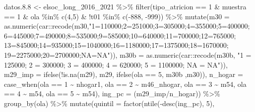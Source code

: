 \documentclass[
  12pt,
]{book}
\newenvironment{Shaded}{\begin{snugshade}}{\end{snugshade}}
\newcommand{\AttributeTok}[1]{\textcolor[rgb]{0.77,0.63,0.00}{#1}}
\newcommand{\DecValTok}[1]{\textcolor[rgb]{0.00,0.00,0.81}{#1}}
\newcommand{\FloatTok}[1]{\textcolor[rgb]{0.00,0.00,0.81}{#1}}
\newcommand{\FunctionTok}[1]{\textcolor[rgb]{0.00,0.00,0.00}{#1}}
\newcommand{\NormalTok}[1]{#1}
\newcommand{\OtherTok}[1]{\textcolor[rgb]{0.56,0.35,0.01}{#1}}
\newcommand{\SpecialCharTok}[1]{\textcolor[rgb]{0.00,0.00,0.00}{#1}}
\newcommand{\StringTok}[1]{\textcolor[rgb]{0.31,0.60,0.02}{#1}}
\begin{document}
\begin{Shaded}
\begin{Highlighting}[]
\NormalTok{datos.}\FloatTok{8.8} \OtherTok{\textless{}{-}}\NormalTok{ elsoc\_long\_2016\_2021 }\SpecialCharTok{\%\textgreater{}\%} 
  \FunctionTok{filter}\NormalTok{(tipo\_atricion }\SpecialCharTok{==} \DecValTok{1} \SpecialCharTok{\&}\NormalTok{ muestra }\SpecialCharTok{==} \DecValTok{1} \SpecialCharTok{\&}\NormalTok{ ola }\SpecialCharTok{\%in\%} \FunctionTok{c}\NormalTok{(}\DecValTok{4}\NormalTok{,}\DecValTok{5}\NormalTok{) }\SpecialCharTok{\&} \SpecialCharTok{!}\NormalTok{t01 }\SpecialCharTok{\%in\%} \FunctionTok{c}\NormalTok{(}\SpecialCharTok{{-}}\DecValTok{888}\NormalTok{, }\SpecialCharTok{{-}}\DecValTok{999}\NormalTok{)) }\SpecialCharTok{\%\textgreater{}\%} 
  \FunctionTok{mutate}\NormalTok{(}\AttributeTok{m30 =} \FunctionTok{as.numeric}\NormalTok{(car}\SpecialCharTok{::}\FunctionTok{recode}\NormalTok{(m30,}\StringTok{"1=110000;2=251000;3=305000;4=355000;5=400000;}
\StringTok{                                           6=445000;7=490000;8=535000;9=585000;10=640000;11=700000;12=765000;}
\StringTok{                                           13=845000;14=935000;15=1040000;16=1180000;17=1375000;18=1670000;}
\StringTok{                                           19=2275000;20=2700000;NA=NA"}\NormalTok{)),}
         \AttributeTok{m30b =} \FunctionTok{as.numeric}\NormalTok{(car}\SpecialCharTok{::}\FunctionTok{recode}\NormalTok{(m30b, }\StringTok{"1 = 125000; 2 = 300000; 3 = 400000; 4 = 620000; 5 = 1100000; NA = NA"}\NormalTok{)),}
         \AttributeTok{m29\_imp =} \FunctionTok{ifelse}\NormalTok{(}\SpecialCharTok{!}\FunctionTok{is.na}\NormalTok{(m29), m29, }\FunctionTok{ifelse}\NormalTok{(ola }\SpecialCharTok{==} \DecValTok{5}\NormalTok{, m30b ,m30)),}
         \AttributeTok{n\_hogar =} \FunctionTok{case\_when}\NormalTok{(ola }\SpecialCharTok{==} \DecValTok{1} \SpecialCharTok{\textasciitilde{}}\NormalTok{ nhogar1, ola }\SpecialCharTok{==} \DecValTok{2} \SpecialCharTok{\textasciitilde{}}\NormalTok{ m46\_nhogar,}
\NormalTok{                             ola }\SpecialCharTok{==} \DecValTok{3} \SpecialCharTok{\textasciitilde{}}\NormalTok{ m54, ola }\SpecialCharTok{==} \DecValTok{4} \SpecialCharTok{\textasciitilde{}}\NormalTok{ m54, ola }\SpecialCharTok{==} \DecValTok{5} \SpecialCharTok{\textasciitilde{}}\NormalTok{ m54),}
         \AttributeTok{ing\_pc =}\NormalTok{ (m29\_imp}\SpecialCharTok{/}\NormalTok{n\_hogar)) }\SpecialCharTok{\%\textgreater{}\%}
  \FunctionTok{group\_by}\NormalTok{(ola) }\SpecialCharTok{\%\textgreater{}\%} 
  \FunctionTok{mutate}\NormalTok{(}\AttributeTok{quintil =} \FunctionTok{factor}\NormalTok{(}\FunctionTok{ntile}\NormalTok{(}\SpecialCharTok{{-}}\FunctionTok{desc}\NormalTok{(ing\_pc), }\DecValTok{5}\NormalTok{), }

\end{Highlighting}
\end{Shaded}
\end{document}
